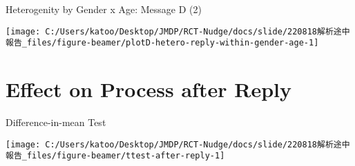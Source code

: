 \documentclass[
      aspectratio=169,
        12pt,
    ]{beamer}
\begin{document}
\begin{frame}{Heterogenity by Gender x Age: Message D (2)}
\protect\hypertarget{heterogenity-by-gender-x-age-message-d-2}{}
\begin{center}\texttt{[image: C:/Users/katoo/Desktop/JMDP/RCT-Nudge/docs/slide/220818解析途中報告\_files/figure-beamer/plotD-hetero-reply-within-gender-age-1]} \end{center}
\end{frame}

\hypertarget{effect-on-process-after-reply}{%
\section{Effect on Process after Reply}\label{effect-on-process-after-reply}}

\begin{frame}{Difference-in-mean Test}
\protect\hypertarget{difference-in-mean-test}{}
\begin{center}\texttt{[image: C:/Users/katoo/Desktop/JMDP/RCT-Nudge/docs/slide/220818解析途中報告\_files/figure-beamer/ttest-after-reply-1]} \end{center}
\end{frame}
\end{document}
